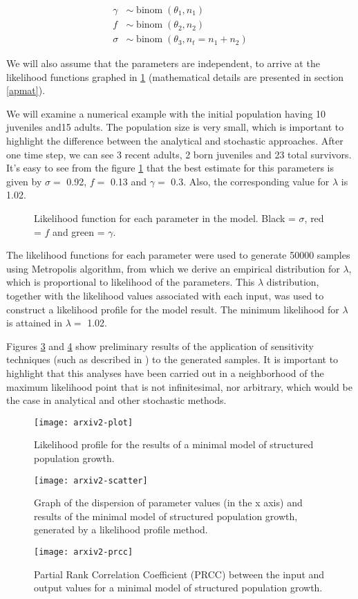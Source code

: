 \documentclass[twoside,12pt,a4paper]{article}
\begin{document}
\begin{align}
	\gamma & \sim \operatorname{binom}(\theta_1, n_1) \\
	f      & \sim \operatorname{binom}(\theta_2, n_2) \\
	\sigma & \sim \operatorname{binom}(\theta_3, n_t = n_1+n_2)
\end{align}

We will also assume that the parameters are independent, to arrive at the likelihood functions graphed in
\ref{fig:LikFunc} (mathematical details are presented in section \ref{apmat}).


We will examine a numerical example with the initial population having 10 juveniles and15
adults. The population size is very small, which is important to highlight the difference between the
analytical and stochastic approaches. After one time step, we can see 
3 recent adults, 2 born juveniles and 23 total survivors. It's 
easy to see from the figure \ref{fig:LikFunc} that the best estimate for this parameters is given by
$\sigma = $ 0.92, $f = $ 0.13 and $\gamma = $ 0.3.
Also, the corresponding value for $\lambda$ is 1.02.

\begin{figure}
	\caption{Likelihood function for each parameter in the model. Black = $\sigma$, red = $f$ and green = $\gamma$.}
	\label{fig:LikFunc}
\end{figure}

The likelihood functions for each parameter were used to generate
50000 samples using Metropolis algorithm, from which we derive an empirical distribution for
$\lambda$, which is proportional to likelihood of the parameters.
This $\lambda$ distribution, together with the likelihood values associated with each input, was used to
construct a likelihood profile for the model result. The minimum likelihood for 
$\lambda$ is attained in $\lambda = $ 1.02.

Figures \ref{fig:lambdascatter} and \ref{fig:lambdaprcc} show preliminary results of the application of
sensitivity techniques (such as described in \citep{Chalom12}) to the generated samples. It is important
to highlight that this analyses have been carried out in a neighborhood of the maximum likelihood point
that is not infinitesimal, nor arbitrary, which would be the case in analytical and other stochastic methods.

\begin{figure}
\texttt{[image: arxiv2-plot]}
	\caption{Likelihood profile for the results of a minimal model of structured population growth.}
	\label{fig:lambda}
\end{figure}
\begin{figure}
\texttt{[image: arxiv2-scatter]}
	\caption{Graph of the dispersion of parameter values (in the x axis) and results of the 
  minimal model of structured population growth, generated by a likelihood profile method.  }
	\label{fig:lambdascatter}
\end{figure}
\begin{figure}
\texttt{[image: arxiv2-prcc]}
	\caption{Partial Rank Correlation Coefficient (PRCC) between the input and output values for a 
  minimal model of structured population growth.}
	\label{fig:lambdaprcc}
\end{figure}
\end{document}
